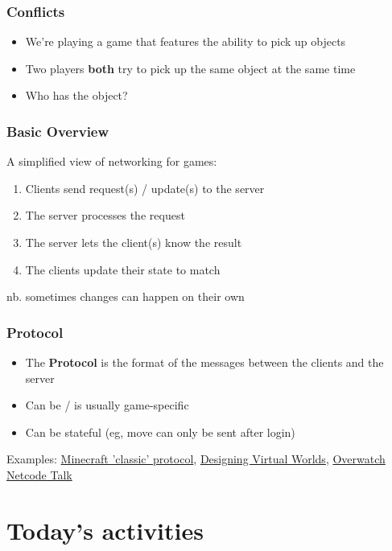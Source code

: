 \documentclass{beamer}
\begin{document}
	\begin{frame}
		\frametitle{Conflicts}
		
		\begin{itemize}
			\item We're playing a game that features the ability to pick up objects
			\item Two players \textbf{both} try to pick up the same object at the same time
			\item Who has the object?
		\end{itemize}
	\end{frame}

	\begin{frame}
		\frametitle{Basic Overview}
		
		A simplified view of networking for games:
		
		\begin{enumerate}
			\item Clients send request(s) / update(s) to the server
			\item The server processes the request
			\item The server lets the client(s) know the result
			\item The clients update their state to match
		\end{enumerate}
	
		nb. sometimes changes can happen on their own
	\end{frame}
	
	\begin{frame}
		\frametitle{Protocol}
		
		\begin{itemize}
			\item The \textbf{Protocol} is the format of the messages between the clients and the server
			\item Can be / is usually game-specific
			\item Can be stateful (eg, move can only be sent after login)
		\end{itemize}
	
		Examples: \href{https://minecraft.gamepedia.com/Classic_server_protocol}{Minecraft 'classic' protocol}, \href{https://www.amazon.com/Designing-Virtual-Worlds-Richard-Bartle/dp/0131018167}{Designing Virtual Worlds},
		\href{https://www.youtube.com/watch?v=W3aieHjyNvw}{Overwatch Netcode Talk}
	\end{frame}
	
	\section{Today's activities}
	
\end{document}
